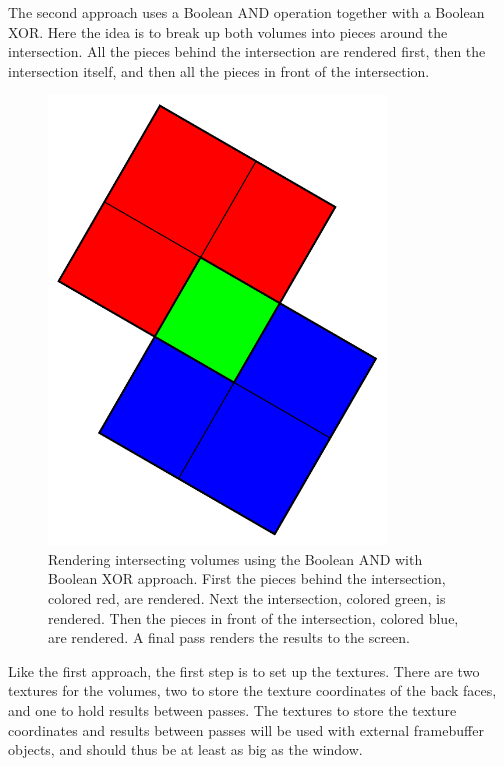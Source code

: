 \documentclass{article}
\begin{document}
The second approach uses a Boolean AND operation together with a Boolean XOR.
Here the idea is to break up both volumes into pieces around the intersection.
All the pieces behind the intersection are rendered first, then the intersection
itself, and then all the pieces in front of the intersection.

\begin{figure}
\centering
\includegraphics[width=0.8\textwidth]{boolean-xor.pdf}
\caption{
Rendering intersecting volumes using the Boolean AND with Boolean XOR approach.
First the pieces behind the intersection, colored red, are rendered.  Next the
intersection, colored green, is rendered.  Then the pieces in front of the
intersection, colored blue, are rendered.  A final pass renders the results to
the screen.
}
\label{boolean-xor}
\end{figure}

Like the first approach, the first step is to set up the textures.  There are
two textures for the volumes, two to store the texture coordinates of the back
faces, and one to hold results between passes.  The textures to store the
texture coordinates and results between passes will be used with external
framebuffer objects, and should thus be at least as big as the window.
\end{document}
